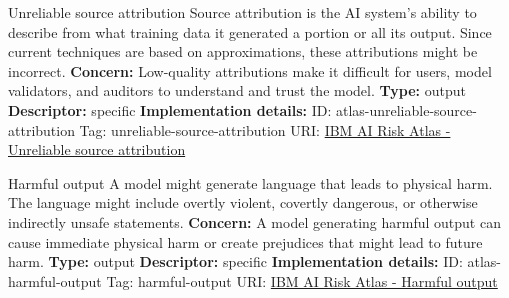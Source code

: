 \documentclass[a4paper,12pt]{article}
\begin{document}
\begin{definitionbox}{Unreliable source attribution}
Source attribution is the AI system's ability to describe from what training data it generated a portion or all its output. Since current techniques are based on approximations, these attributions might be incorrect.\newline\newline
\textbf{Concern: }Low-quality attributions make it difficult for users, model validators, and auditors to understand and trust the model.\newline\newline
\textbf{Type: }output\newline
\textbf{Descriptor: }specific \newline\newline
\textbf{Implementation details: } \newline
ID: atlas-unreliable-source-attribution \newline
Tag: unreliable-source-attribution \newline
URI:  \href{https://www.ibm.com/docs/en/watsonx/saas?topic=SSYOK8/wsj/ai-risk-atlas/unreliable-source-attribution.html}{IBM AI Risk Atlas - Unreliable source attribution}\newline
\end{definitionbox}
\begin{definitionbox}{Harmful output}
A model might generate language that leads to physical harm. The language might include overtly violent, covertly dangerous, or otherwise indirectly unsafe statements.\newline\newline
\textbf{Concern: }A model generating harmful output can cause immediate physical harm or create prejudices that might lead to future harm.\newline\newline
\textbf{Type: }output\newline
\textbf{Descriptor: }specific \newline\newline
\textbf{Implementation details: } \newline
ID: atlas-harmful-output \newline
Tag: harmful-output \newline
URI:  \href{https://www.ibm.com/docs/en/watsonx/saas?topic=SSYOK8/wsj/ai-risk-atlas/harmful-output.html}{IBM AI Risk Atlas - Harmful output}\newline
\end{definitionbox}
\end{document}
